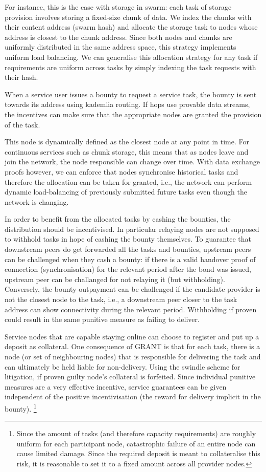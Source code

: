\documentclass[a4paper,10pt]{article}
\begin{document}
For instance, this is the case with storage in swarm:
each task of storage provision involves storing a fixed-size chunk of data.
We index the chunks with their content address (swarm hash) and allocate the storage task
to nodes whose address is closest to the chunk address.
Since both nodes and chunks are uniformly distributed in the same address space,
this strategy implements uniform load balancing. We can generalise this allocation
strategy for any task if requirements
are uniform across tasks by simply indexing the task requests with their hash.

When a service user issues a bounty to request a service task, the bounty
is sent towards its address using kademlia routing.
If hops use provable data streams, the incentives can make sure
that the appropriate nodes are granted the provision of the task.

This node is dynamically defined as the closest node at any point in time.
For continuous services such as chunk storage, this means that as nodes leave
and join the network, the node responsible can change over time.
With data exchange proofs however, we can enforce that nodes synchronise historical
tasks and therefore the allocation can be taken for granted, i.e., the network
can perform dynamic load-balancing of previously submitted future tasks even though
the network is changing.

In order to benefit from the allocated tasks by cashing the bounties, the distribution
should be incentivised. In particular relaying nodes are not supposed to withhold
tasks in hope of cashing the bounty themselves.
To guarantee that downstream peers do get forwarded all the tasks and bounties,
upstream peers can be challenged when they cash a bounty:
if there is a valid handover proof of connection (synchronisation)
for the relevant period after the bond was issued, upstream peer can be challanged
for not relaying it (but withholding). Conversely, the bounty outpayment can be challenged
if the candidate provider is not the closest node to the task, i.e., a downstream peer closer to
the task address can show connectivity during the relevant period. Withholding if proven could
result in the same punitive measure as failing to deliver.


Service nodes that are capable staying online can choose to register
and put up a deposit as collateral.
One consequence of GRANT is that for each task, there is a node (or set of neighbouring nodes)
that is responsible for delivering the task and can ultimately be held liable
for non-delivery. Using the swindle scheme for litigation, if proven guilty node's
collateral is forfeited.
Since individual punitive measures are a very
effective incentive, service guarantees can be given independent of the
positive incentivisation (the reward for delivery implicit in the bounty).%
%
\footnote{Since the amount of tasks (and therefore capacity requirements) are roughly uniform for each
participant node, catastrophic failure of an entire node can cause limited damage.
Since the required deposit is meant to collateralise this risk, it is reasonable to
set it to a fixed amount across all provider nodes.}
\end{document}
